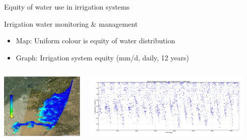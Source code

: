 \documentclass[xcolor=dvipsnames,beamer]{beamer} %
\begin{document}
\begin{frame}[fragile]{Equity of water use in irrigation systems}

Irrigation water monitoring \& management
\begin{itemize}
 \item Map: Uniform colour is equity of water distribution
 \item Graph: Irrigation system equity (mm/d, daily, 12 years)
\end{itemize}

\begin{columns}[l]
\begin{center}
\includegraphics[width=4cm]{fess2012ef}
\end{center}

\begin{flushleft}
  \includegraphics[width=8cm]{fess2012meaneftemporal}
\end{flushleft}
\end{columns}
\end{frame}
\end{document}
